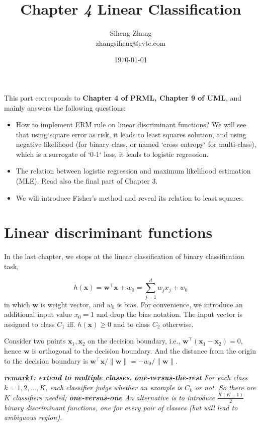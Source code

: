 \documentclass{article}
\author{Siheng Zhang\\zhangsiheng@cvte.com}
\title{Chapter \textbf{\textit{4}} Linear Classification}
\date{\today}
\begin{document}
\maketitle  

This part corresponds to \textbf{Chapter 4 of PRML, Chapter 9 of UML}, and mainly answers the following questions:

\begin{itemize}
\item How to implement ERM rule on linear discriminant functions? We will see that using square error as risk, it leads to least squares solution, and using negative likelihood (for binary class, or named `cross entropy`  for multi-class), which is a surrogate of `0-1` loss, it leads to logistic regression.
\item The relation between logistic regression and maximum likelihood estimation (MLE). Read also the final part of Chapter 3.
\item We will introduce Fisher's method and reveal its relation to least squares.
\end{itemize}

\tableofcontents
\newpage

\section{Linear discriminant functions}
	In the last chapter, we stops at the linear classification of binary classification task,
	
	\begin{equation}
	h(\mathbf{x})=\mathbf{w}^\top \mathbf{x} + w_0 = \sum_{j=1}^d w_j x_j + w_0
	\label{eq:linear}
	\end{equation}
in which $\mathbf{w}$ is weight vector, and $w_0$ is bias. For convenience, we introduce an additional input value $x_0 = 1$ and drop the bias notation. The input vector is assigned to class $C_1$ iff. $h(\mathbf{x})\geq 0$ and to class $C_2$ otherwise.

	Consider two points $\mathbf{x}_1,\mathbf{x}_2$ on the decision boundary, i.e., $\mathbf{w}^\top (\mathbf{x}_1 - \mathbf{x}_2) = 0$, hence $\mathbf{w}$ is orthogonal to the decision boundary. And the distance from the origin to the decision boundary is $\mathbf{w}^\top \mathbf{x} / \|\mathbf{w}\|=-w_0/\|\mathbf{w}\|$.
	
	\begin{framed}
	\begin{scriptsize}
	\begin{spacing}{1.2}
	\noindent\textit{\textbf{remark1: extend to multiple classes.}  \textbf{one-versus-the-rest} For each class $k=1,2,...,K$, each classifier judge whether an example is $C_k$ or not. So there are $K$ classifiers needed;  \textbf{one-versus-one} An alternative is to introduce $\frac{K(K-1)}{2}$ binary discriminant functions, one for every pair of classes (but will lead to ambiguous region).}
	\end{spacing}
	\end{scriptsize}
	\end{framed}
		
\end{document}
